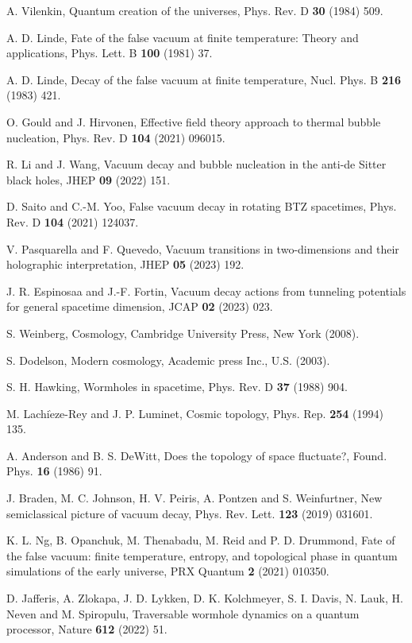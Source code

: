 \documentclass[12pt]{article}
\begin{document}
\begin{thebibliography}{99}
A. Vilenkin, Quantum creation of the universes, Phys. Rev. D {\bf30} (1984) 509.

A. D. Linde, Fate of the false vacuum at finite temperature: Theory and applications, Phys. Lett. B {\bf100} (1981) 37.

A. D. Linde, Decay of the false vacuum at finite temperature, Nucl. Phys. B {\bf216} (1983) 421.

O. Gould and J. Hirvonen, Effective field theory approach to thermal bubble nucleation, Phys. Rev. D  {\bf104} (2021) 096015.

R. Li and J. Wang, Vacuum decay and bubble nucleation in the anti-de Sitter black holes, JHEP {\bf09} (2022) 151.

D. Saito  and C.-M. Yoo, False vacuum decay in rotating BTZ spacetimes, Phys. Rev. D  {\bf104} (2021) 124037.

V. Pasquarella and F. Quevedo, Vacuum transitions in two-dimensions and their holographic interpretation, JHEP {\bf05} (2023) 192.

J. R. Espinosaa and J.-F. Fortin, Vacuum decay actions from tunneling potentials for general spacetime dimension,  JCAP {\bf02} (2023) 023.

S. Weinberg, Cosmology, Cambridge University Press, New York (2008).

S. Dodelson, Modern cosmology, Academic press Inc., U.S. (2003).

S. H. Hawking, Wormholes in spacetime, Phys. Rev. D  {\bf37} (1988) 904.

M. Lachi$\mathrm{\grave{e}}$ze-Rey and J. P. Luminet, Cosmic topology, Phys. Rep. {\bf254} (1994) 135.

A. Anderson and B. S. DeWitt, Does the topology of space fluctuate?, Found. Phys. {\bf16} (1986) 91.

J. Braden, M. C. Johnson, H. V. Peiris, A. Pontzen and S. Weinfurtner, New semiclassical picture of vacuum decay, Phys. Rev. Lett. {\bf 123} (2019) 031601.

K. L. Ng, B. Opanchuk, M. Thenabadu, M. Reid and P. D. Drummond, Fate of the false vacuum: finite temperature, entropy, and topological phase in quantum simulations of the early universe, PRX Quantum  {\bf2} (2021) 010350.

D. Jafferis,  A. Zlokapa, J. D. Lykken, D. K. Kolchmeyer, S. I. Davis, N. Lauk, H. Neven and M. Spiropulu, Traversable wormhole dynamics on a quantum processor, Nature {\bf612} (2022) 51.


\end{thebibliography}
\end{document}

